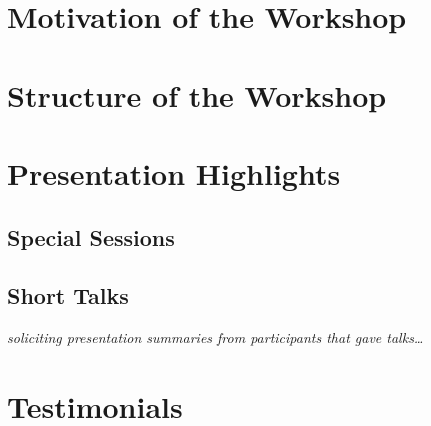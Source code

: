 \section{Motivation of the Workshop}



\section{Structure of the Workshop}



\section{Presentation Highlights}

\subsection{Special Sessions}





\subsection{Short Talks}

\emph{soliciting presentation summaries from participants that gave talks\dots}












\section{Testimonials}






